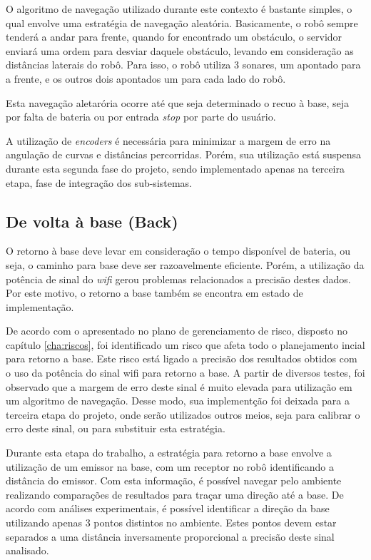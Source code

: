 	 	O algoritmo de navegação utilizado durante este contexto é bastante simples, o qual envolve uma estratégia de navegação aleatória. Basicamente, o robô sempre tenderá a andar para frente, quando for encontrado um obstáculo, o servidor enviará uma ordem para desviar daquele obstáculo, levando em consideração as distâncias laterais do robô. Para isso, o robô utiliza 3 sonares, um apontado para a frente, e os outros dois apontados um para cada lado do robô.

	 	Esta navegação aletarória ocorre até que seja determinado o recuo à base, seja por falta de bateria ou por entrada \textit{stop} por parte do usuário.

	 	A utilização de \textit{encoders} é necessária para minimizar a margem de erro na angulação de curvas e distâncias percorridas. Porém, sua utilização está suspensa durante esta segunda fase do projeto, sendo implementado apenas na terceira etapa, fase de integração dos sub-sistemas.

	 \subsection{De volta à base (Back)} %
	 \label{sub:de_volta_a_base_}
	 	
	 	O retorno à base deve levar em consideração o tempo disponível de bateria, ou seja, o caminho para base deve ser razoavelmente eficiente. Porém, a utilização da potência de sinal do \textit{wifi} gerou problemas relacionados a precisão destes dados. Por este motivo, o retorno a base também se encontra em estado de implementação. 

	 	De acordo com o apresentado no plano de gerenciamento de risco, disposto no capítulo \ref{cha:riscos}, foi identificado um risco que afeta todo o planejamento incial para retorno a base. Este risco está ligado a precisão dos resultados obtidos com o uso da potência do sinal wifi para retorno a base. A partir de diversos testes, foi observado que a margem de erro deste sinal é muito elevada para utilização em um algoritmo de navegação. Desse modo, sua implementção foi deixada para a terceira etapa do projeto, onde serão utilizados outros meios, seja para calibrar o erro deste sinal, ou para substituir esta estratégia.

	 	Durante esta etapa do trabalho, a estratégia para retorno a base envolve a utilização de um emissor na base, com um receptor no robô identificando a distância do emissor. Com esta informação, é possível navegar pelo ambiente realizando comparações de resultados para traçar uma direção até a base. De acordo com análises experimentais, é possível identificar a direção da base utilizando apenas 3 pontos distintos no ambiente. Estes pontos devem estar separados a uma distância inversamente proporcional a precisão deste sinal analisado.


